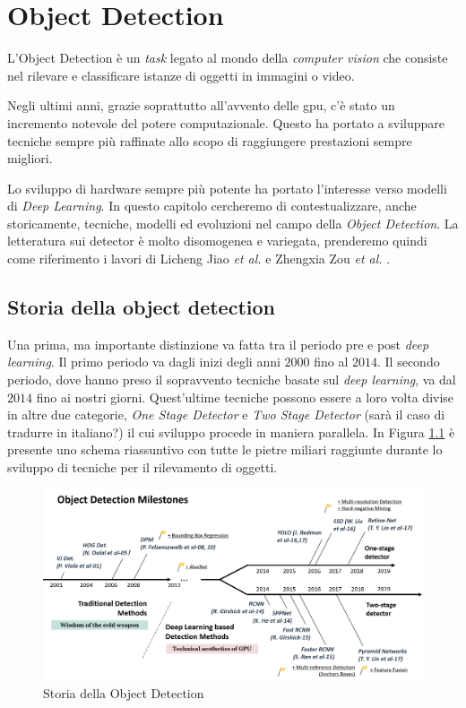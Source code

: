 \chapter{Object Detection}
L'Object Detection è un \textit{task} legato al mondo della \textit{computer vision}
che consiste nel rilevare e classificare istanze di oggetti in immagini o video.

Negli ultimi anni, grazie soprattutto all'avvento delle \ac{gpu}, c'è stato un 
incremento notevole del potere computazionale. Questo ha portato a sviluppare tecniche 
sempre più raffinate allo scopo di raggiungere prestazioni sempre migliori. 

Lo sviluppo di hardware sempre più potente ha portato l'interesse verso modelli di  \textit{Deep Learning}. 
In questo capitolo cercheremo di contestualizzare, anche storicamente, tecniche, modelli ed evoluzioni
nel campo della \textit{Object Detection}. 
La letteratura sui detector è molto disomogenea e variegata, prenderemo quindi come 
riferimento i lavori di Licheng Jiao \textit{et al.} 
\cite{DBLP:journals/corr/abs-1907-09408} e 
Zhengxia Zou \textit{et al.} \cite{DBLP:journals/corr/abs-1905-05055}.


\section{Storia della object detection}
\label{sec:history_obj}
Una prima, ma importante distinzione va fatta tra il periodo pre e post \textit{deep learning}. Il primo periodo va dagli inizi degli anni $2000$ fino al $2014$. Il secondo periodo, dove hanno preso il sopravvento tecniche basate sul \textit{deep learning}, va dal $2014$ fino ai nostri giorni. Quest'ultime tecniche possono essere a loro volta divise in altre due categorie, \textit{One Stage Detector} e \textit{Two Stage Detector} (sarà il caso di tradurre in italiano?) il cui sviluppo procede in maniera parallela. In Figura \ref{fig:history_object_detection} è presente uno schema riassuntivo con tutte le pietre miliari raggiunte durante lo sviluppo di tecniche per il rilevamento di oggetti.
\begin{figure}
    \centering
    \includegraphics[width=\textwidth]{images/mile-stones.png}
    \caption{Storia della Object Detection \cite{DBLP:journals/corr/abs-1905-05055}}
    \label{fig:history_object_detection}
\end{figure}
